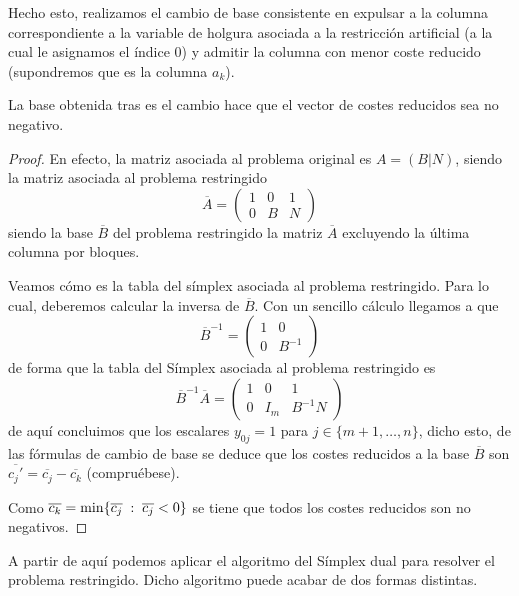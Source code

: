 Hecho esto, realizamos el cambio de base consistente en expulsar a la columna correspondiente a la variable de holgura asociada a la restricción artificial (a la cual le asignamos el índice $0$) y admitir la columna con menor coste reducido (supondremos que es la columna $a_k$).
\begin{lem}
	La base obtenida tras es el cambio hace que el vector de costes reducidos sea no negativo.
\end{lem}
\begin{proof}
	En efecto, la matriz asociada al problema original es $A=(B|N)$, siendo la matriz asociada al problema restringido
	\begin{equation*}
	\overline{A}=\left(\begin{array}{c|c|c}
	1&0&1\\
	\hline
	0&B&N
	\end{array}\right)
	\end{equation*}
	siendo la base $\overline{B}$ del problema restringido la matriz $\overline{A}$ excluyendo la última columna por bloques.
	
	Veamos cómo es la tabla del símplex asociada al problema restringido. Para lo cual, deberemos calcular la inversa de $\overline{B}$. Con un sencillo cálculo llegamos a que
	\begin{equation*}
	\overline{B}^{-1}=\left(\begin{array}{c|c}
	1&0\\
	\hline
	0&B^{-1}
	\end{array}\right)
	\end{equation*}
	de forma que la tabla del Símplex asociada al problema restringido es
	\begin{equation*}
	\overline{B}^{-1}\overline{A}=
	\left(\begin{array}{c|c|c}
	1&0&1\\
	\hline
	0&I_m&B^{-1}N
	\end{array}\right)
	\end{equation*}
	de aquí concluimos que los escalares $y_{0j}=1$ para $j\in\{m+1,\dots,n\}$, dicho esto, de las fórmulas de cambio de base se deduce que los costes reducidos a la base $\overline{B}$ son $\overline{c_j'}=\overline{c_j}-\overline{c_k}$ (compruébese).
	
	Como $\overline{c_k}=\min\{\overline{c_j}\;:\; \overline{c_j}<0\}$ se tiene que todos los costes reducidos son no negativos.
\end{proof}
A partir de aquí podemos aplicar el algoritmo del Símplex dual para resolver el problema restringido. Dicho algoritmo puede acabar de dos formas distintas.
